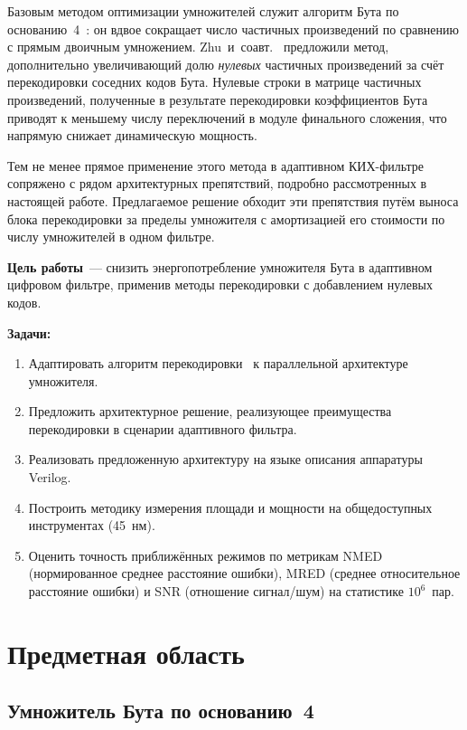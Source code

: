 \documentclass[a4paper, 12pt, oneside]{report}
\begin{document}
Базовым методом оптимизации умножителей служит алгоритм
Бута по основанию~4~\cite{booth1951}: он вдвое сокращает число частичных
произведений по сравнению с прямым двоичным умножением. Zhu~и~соавт.~\cite{zhu2025} предложили метод, дополнительно
увеличивающий долю \textit{нулевых} частичных произведений за счёт
перекодировки соседних кодов Бута. Нулевые строки в
матрице частичных произведений, полученные в результате перекодировки
коэффициентов Бута приводят к меньшему числу переключений в модуле 
финального сложения, что напрямую снижает динамическую мощность.

Тем не менее прямое применение этого метода в адаптивном КИХ-фильтре
сопряжено с рядом архитектурных препятствий, подробно рассмотренных в
настоящей работе. Предлагаемое решение обходит эти препятствия путём
выноса блока перекодировки за пределы умножителя с амортизацией его
стоимости по числу умножителей в одном фильтре.

\textbf{Цель работы}~--- снизить энергопотребление умножителя Бута в
адаптивном цифровом фильтре, применив методы перекодировки с
добавлением нулевых кодов.

\textbf{Задачи:}
\begin{enumerate}
  \item Адаптировать алгоритм перекодировки~\cite{zhu2025}
        к параллельной архитектуре умножителя.
  \item Предложить архитектурное решение, реализующее преимущества
        перекодировки в сценарии адаптивного фильтра.
  \item Реализовать предложенную архитектуру на языке описания
        аппаратуры Verilog.
  \item Построить методику измерения площади и мощности на
        общедоступных инструментах (45~нм).
  \item Оценить точность приближённых режимов по метрикам NMED
        (нормированное среднее расстояние ошибки), MRED (среднее
        относительное расстояние ошибки) и SNR (отношение сигнал/шум)
        на статистике $10^6$~пар.
\end{enumerate}

\chapter{Предметная область}

\section{Умножитель Бута по основанию~4}
\end{document}
